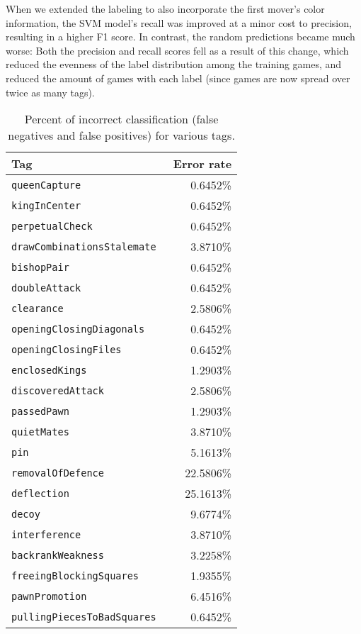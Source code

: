 \documentclass[11pt]{article}
\begin{document}
When we extended the labeling to also incorporate the first mover's color information, the SVM model's recall was improved at a minor cost to precision, resulting in a higher F1 score. In contrast, the random predictions became much worse: Both the precision and recall scores fell as a result of this change, which reduced the evenness of the label distribution among the training games, and reduced the amount of games with each label (since games are now spread over twice as many tags).
\begin{table}
\centering
\begin{tabular}{lr}
\hline
\textbf{Tag} & \textbf{Error rate} \\ \hline
\tt{queenCapture}  & 0.6452\% \\
\tt{kingInCenter}  & 0.6452\% \\
\tt{perpetualCheck}  & 0.6452\% \\
\tt{drawCombinationsStalemate}  & 3.8710\% \\
\tt{bishopPair}  & 0.6452\% \\
\tt{doubleAttack}  & 0.6452\% \\
\tt{clearance}  & 2.5806\% \\
\tt{openingClosingDiagonals}  & 0.6452\% \\
\tt{openingClosingFiles}  & 0.6452\% \\
\tt{enclosedKings}  & 1.2903\% \\
\tt{discoveredAttack}  & 2.5806\% \\
\tt{passedPawn}  & 1.2903\% \\
\tt{quietMates}  & 3.8710\% \\
\tt{pin}  & 5.1613\% \\
\tt{removalOfDefence}  & 22.5806\% \\
\tt{deflection}  & 25.1613\% \\
\tt{decoy}  & 9.6774\% \\
\tt{interference}  & 3.8710\% \\
\tt{backrankWeakness}  & 3.2258\% \\
\tt{freeingBlockingSquares}  & 1.9355\% \\
\tt{pawnPromotion}  & 6.4516\% \\
\tt{pullingPiecesToBadSquares}  & 0.6452\%
\end{tabular} 
\caption{Percent of incorrect classification (false negatives and false positives) for various tags.}
\label{table:negatives}
\end{table}
\end{document}
